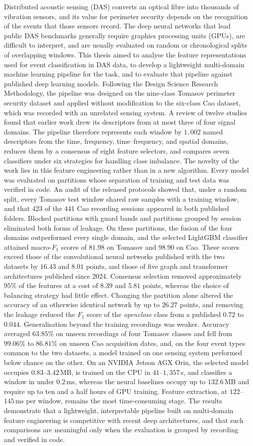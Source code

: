 Distributed acoustic sensing (DAS) converts an optical fibre into thousands of vibration sensors, and its value for perimeter security depends on the recognition of the events that those sensors record. The deep neural networks that lead public DAS benchmarks generally require graphics processing units (GPUs), are difficult to interpret, and are usually evaluated on random or chronological splits of overlapping windows. This thesis aimed to analyse the feature representations used for event classification in DAS data, to develop a lightweight multi-domain machine learning pipeline for the task, and to evaluate that pipeline against published deep learning models. Following the Design Science Research Methodology, the pipeline was designed on the nine-class Tomasov perimeter security dataset and applied without modification to the six-class Cao dataset, which was recorded with an unrelated sensing system. A review of twelve studies found that earlier work drew its descriptors from at most three of four signal domains. The pipeline therefore represents each window by $1{,}002$ named descriptors from the time, frequency, time--frequency, and spatial domains, reduces them by a consensus of eight feature selectors, and compares seven classifiers under six strategies for handling class imbalance. The novelty of the work lies in this feature engineering rather than in a new algorithm. Every model was evaluated on partitions whose separation of training and test data was verified in code. An audit of the released protocols showed that, under a random split, every Tomasov test window shared raw samples with a training window, and that 423 of the 441 Cao recording sessions appeared in both published folders. Blocked partitions with guard bands and partitions grouped by session eliminated both forms of leakage. On these partitions, the fusion of the four domains outperformed every single domain, and the selected LightGBM classifier attained macro-$F_1$ scores of $81.98$ on Tomasov and $98.90$ on Cao. These scores exceed those of the convolutional neural networks published with the two datasets by $16.43$ and $8.01$ points, and those of five graph and transformer architectures published since 2024. Consensus selection removed approximately $95\%$ of the features at a cost of $8.39$ and $5.81$ points, whereas the choice of balancing strategy had little effect. Changing the partition alone altered the accuracy of an otherwise identical network by up to $26.27$ points, and removing the leakage reduced the $F_1$ score of the \emph{openclose} class from a published $0.72$ to $0.044$. Generalisation beyond the training recordings was weaker. Accuracy averaged $63.85\%$ on unseen recordings of four Tomasov classes and fell from $99.06\%$ to $86.81\%$ on unseen Cao acquisition dates, and, on the four event types common to the two datasets, a model trained on one sensing system performed below chance on the other. On an NVIDIA Jetson AGX Orin, the selected model occupies $0.83$--$3.42$\,MB, is trained on the CPU in $41$--$1{,}357$\,s, and classifies a window in under $0.2$\,ms, whereas the neural baselines occupy up to $132.6$\,MB and require up to ten and a half hours of GPU training. Feature extraction, at $122$--$145$\,ms per window, remains the most time-consuming stage. The results demonstrate that a lightweight, interpretable pipeline built on multi-domain feature engineering is competitive with recent deep architectures, and that such comparisons are meaningful only when the evaluation is grouped by recording and verified in code.
